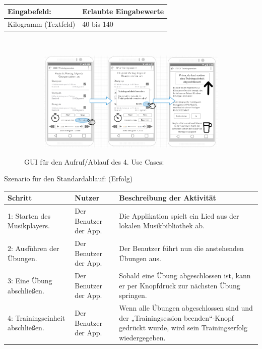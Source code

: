 \documentclass[FIPLY_base.tex]{subfiles}
\begin{document}
	\begin{center}
		\def\arraystretch{1.3}%
		\begin{tabular}{| p{5cm} | p{5cm} |}
			\hline
			\textbf{Eingabefeld:} & \textbf{Erlaubte Eingabewerte} \\ \hline 
			Kilogramm (Textfeld) & 40 bis 140 \\ \hline
		\end{tabular} \\
	\end{center}	
	\begin{figure}[H]
		\begin{subfigure}[b]{0.3\textwidth}
			\includegraphics[scale=0.4]{img/Trainingssessionabgeschlossen}
		\end{subfigure}
		\caption{GUI für den Aufruf/Ablauf des 4. Use Cases:}
	\end{figure}
	Szenario für den Standardablauf: (Erfolg)
	\begin{center}	
		\def\arraystretch{1.3}%
		\begin{tabular}{| p{4cm} | p{3cm} | p{5cm} |}
			\hline
			\textbf{Schritt} & \textbf{Nutzer} & \textbf{Beschreibung der Aktivität}  \\ \hline 
			1: Starten des Musikplayers. & Der Benutzer der App. & Die Applikation spielt ein Lied aus der lokalen Musikbibliothek ab.\\ \hline
			2: Ausführen der Übungen. & Der Benutzer der App. & Der Benutzer führt nun die anstehenden Übungen aus. \\ \hline
			3: Eine Übung abschließen. & Der Benutzer der App. & Sobald eine Übung abgeschlossen ist, kann er per Knopfdruck zur nächsten Übung springen.  \\ \hline
			4: Trainingseinheit abschließen. & Der Benutzer der App. & Wenn alle Übungen abgeschlossen sind und der „Trainingsession beenden“-Knopf gedrückt wurde, wird sein Trainingserfolg wiedergegeben.  \\ \hline
		\end{tabular} \\
	\end{center}
\end{document}
